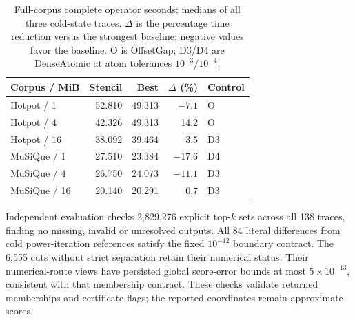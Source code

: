 \begin{table}[t]\centering\small
\setlength{\tabcolsep}{3.5pt}
\caption{Full-corpus complete operator seconds: medians of all three cold-state traces.
$\Delta$ is the percentage time reduction versus the strongest baseline;
negative values favor the baseline. O is OffsetGap; D3/D4 are DenseAtomic
at atom tolerances $10^{-3}/10^{-4}$.}\label{tab:v6complete}
\begin{tabular}{lrrrl}\toprule
Corpus / MiB & Stencil & Best & $\Delta$ (\%) & Control\\\midrule
Hotpot / 1 & 52.810 & 49.313 & $-7.1$ & O\\
Hotpot / 4 & 42.326 & 49.313 & 14.2 & O\\
Hotpot / 16 & 38.092 & 39.464 & 3.5 & D3\\
MuSiQue / 1 & 27.510 & 23.384 & $-17.6$ & D4\\
MuSiQue / 4 & 26.750 & 24.073 & $-11.1$ & D3\\
MuSiQue / 16 & 20.140 & 20.291 & 0.7 & D3\\\bottomrule
\end{tabular}
\end{table}

Independent evaluation checks 2,829,276 explicit top-$k$ sets across all
138 traces, finding no missing, invalid or unresolved outputs. All 84 literal
differences from cold power-iteration references satisfy the fixed $10^{-12}$
boundary contract. The 6,555 cuts without strict separation retain their
numerical status. Their numerical-route views have persisted global
score-error bounds at most $5\times10^{-13}$, consistent with that membership
contract. These checks validate returned memberships and certificate flags;
the reported coordinates remain approximate scores.
